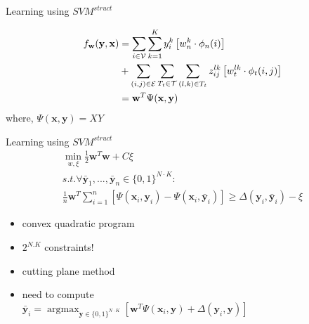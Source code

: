 \documentclass{beamer}
\DeclareMathOperator*{\argmax}{argmax}
\newcommand{\n}{{n}}             %
\newcommand{\x}{{\mathbf x}}     %
\newcommand{\y}{{\mathbf y}}     %
\newcommand{\ysc}[2]{{y_{#1}^{#2}}}    %
\newcommand{\zsc}[2]{{z_{#1}^{#2}}}    %
\newcommand{\fn}[1]{{\phi_n(#1)}}      %
\newcommand{\fe}[3]{{\phi_{#1}(#2,#3)}}%
\newcommand{\w}{{\mathbf w}}           %
\newcommand{\wn}[1]{{w_n^{#1}}}        %
\newcommand{\we}[3]{{w_{#1}^{#2#3}}}   %
\newcommand{\df}[3]{{f_{#3}(#1,#2)}}   %
\newcommand{\loss}[2]{{\Delta(#1,#2)}}   %
\begin{document}
\begin{frame}{Learning using $SVM^{struct}$}

\begin{equation} \label{eq:model}
\begin{split}
\df{\y}{\x}{\w} & = \sum_{i \in \mathcal{V}} \sum_{k=1}^{K} \ysc{i}{k} \left[\wn{k} \cdot \fn{i} \right] \\
 & + \sum_{(i,j)\in \mathcal{E}}   \sum_{T_t \in {\cal T}}  \sum_{(l,k)\in T_t} \zsc{ij}{lk}   \left[\we{t}{l}{k} \cdot \fe{t}{i}{j}\right] \\
& = \w^T \Psi(\x,\y)
 \end{split}
\end{equation}
where, $\Psi(\x,\y)=XY$

\end{frame}

\begin{frame}{Learning using $SVM^{struct}$}
\begin{eqnarray} \label{eq:trainqp}
\min_{w,\xi}    \frac{1}{2} \w^T\w + C\xi\\
s.t.   \forall \bar{\y}_1,...,\bar{\y}_\n \in \{0,1\}^{N \cdot K} :\\
 \frac{1}{n} \w^T \sum_{i=1}^{n} [\Psi( \x_i, \y_i) \nonumber - \Psi(\x_i,\bar{\y}_i)] \ge \Delta(\y_i,\bar{\y}_i) -\xi \nonumber
\end{eqnarray}

\begin{itemize}
\item convex quadratic program
\item $2^{N.K}$ constraints!
\item cutting plane method
\item need to compute \\ $\bar{\y}_i  = \argmax_{\y \in \{0,1\}^{N \cdot K}} \left[ \w^T \Psi(\x_i,\y) + \loss{\y_i}{\y} \right]$
\end{itemize}
\end{frame}
\end{document}

